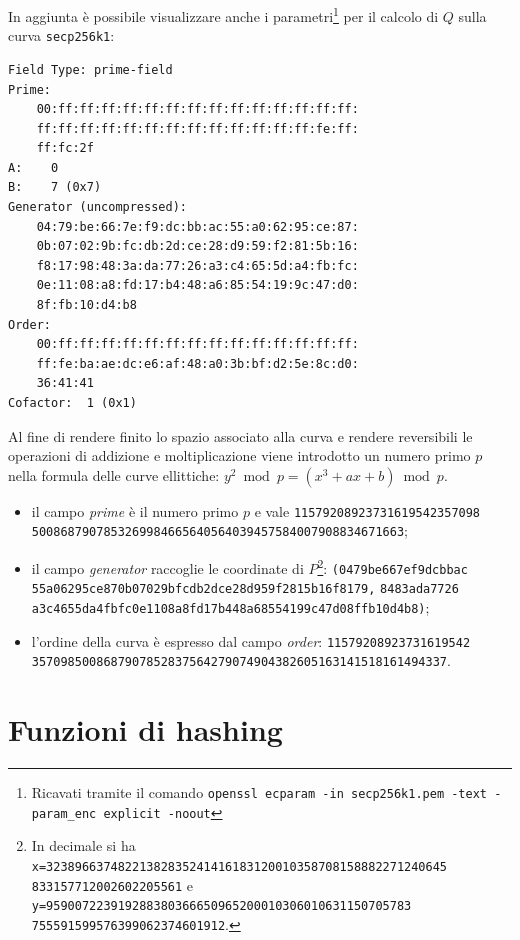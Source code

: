 In aggiunta è possibile visualizzare anche i parametri\footnote{Ricavati tramite il comando \texttt{openssl ecparam -in secp256k1.pem -text -param\_enc explicit -noout}} per il calcolo di $Q$ sulla curva \texttt{secp256k1}:
\begin{lstlisting}[frame=none]
Field Type: prime-field
Prime:
    00:ff:ff:ff:ff:ff:ff:ff:ff:ff:ff:ff:ff:ff:ff:
    ff:ff:ff:ff:ff:ff:ff:ff:ff:ff:ff:ff:ff:fe:ff:
    ff:fc:2f
A:    0
B:    7 (0x7)
Generator (uncompressed):
    04:79:be:66:7e:f9:dc:bb:ac:55:a0:62:95:ce:87:
    0b:07:02:9b:fc:db:2d:ce:28:d9:59:f2:81:5b:16:
    f8:17:98:48:3a:da:77:26:a3:c4:65:5d:a4:fb:fc:
    0e:11:08:a8:fd:17:b4:48:a6:85:54:19:9c:47:d0:
    8f:fb:10:d4:b8
Order:
    00:ff:ff:ff:ff:ff:ff:ff:ff:ff:ff:ff:ff:ff:ff:
    ff:fe:ba:ae:dc:e6:af:48:a0:3b:bf:d2:5e:8c:d0:
    36:41:41
Cofactor:  1 (0x1)
\end{lstlisting}
Al fine di rendere finito lo spazio associato alla curva e rendere reversibili le operazioni di addizione e moltiplicazione viene introdotto un numero primo $p$ nella formula delle curve ellittiche: $y^2 \bmod p =(x^3+ax+b) \bmod p$.
\begin{itemize}
    \item il campo \textit{prime} è il numero primo $p$ e vale \texttt{11579208923731619542357098\\5008687907853269984665640564039457584007908834671663};
    \item il campo \textit{generator} raccoglie le coordinate di $P$\footnote{In decimale si ha \texttt{x=32389663748221382835241416183120010358708158882271240645\\833157712002602205561} e \texttt{y=959007223919288380366650965200010306010631150705783\\755591599576399062374601912}.}: \texttt{(0479be667ef9dcbbac\\55a06295ce870b07029bfcdb2dce28d959f2815b16f8179,} \texttt{8483ada7726\\a3c4655da4fbfc0e1108a8fd17b448a68554199c47d08ffb10d4b8)};
\item l'ordine della curva è espresso dal campo \textit{order}: \texttt{11579208923731619542\\3570985008687907852837564279074904382605163141518161494337}.
\end{itemize}

\section{Funzioni di hashing}


